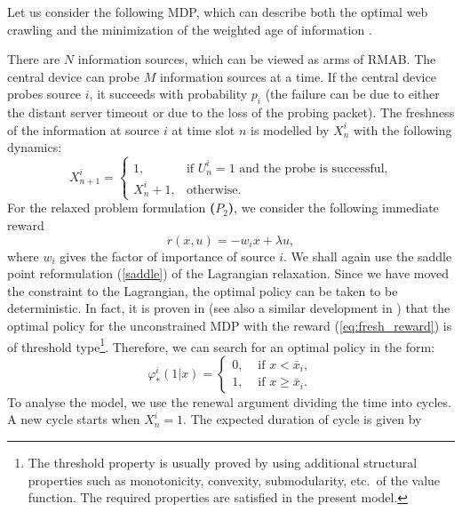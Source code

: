\documentclass[12pt]{article}
\numberwithin{equation}{section}
\newcommand{\1}{\textbf{1}}
\begin{document}
Let us consider the following MDP, which can describe both the optimal 
web crawling \cite{Avrachenkov} and the minimization of the weighted age of information \cite{Hsu,Sombabu}. 

There are $N$ information sources, which can be viewed as arms of RMAB. The central device can 
probe $M$ information sources at a time. If the central device probes source $i$, it succeeds with
probability $p_i$ (the failure can be due to either the distant server timeout or due to the loss of 
the probing packet). The freshness of the information at source $i$ at time slot $n$ is modelled 
by $X^i_n$ with the following dynamics:
\begin{equation}
\label{eq:fresh_dynamics}
X^i_{n+1}=
\left\{\begin{array}{ll}
1, & \mbox{if \ } U^i_n=1 \mbox{ \ and the probe is successful,}\\
X^i_n + 1, &  \mbox{otherwise}.
\end{array}\right.
\end{equation}
For the relaxed problem formulation \textbf{($P_2$)}, we consider the following immediate
reward
\begin{equation}
\label{eq:fresh_reward}
r(x,u) = -w_i x + \lambda u,
\end{equation}
where $w_i$ gives the factor of importance of source $i$.
We shall again use the saddle point reformulation (\ref{saddle}) of the Lagrangian relaxation.
Since we have moved the constraint to the Lagrangian, the optimal policy can be taken to be deterministic. In fact, it is proven in \cite{Hsu} (see also a similar development in \cite{Avrachenkov})
that the optimal policy for the unconstrained MDP with the reward (\ref{eq:fresh_reward})
is of threshold type\footnote{The threshold property is usually proved by using additional structural properties such as monotonicity, convexity, submodularity, etc.\ of the value function. The required properties are satisfied in the present model.}. Therefore, we can search for an optimal policy in the form:
\begin{equation}
\label{thres_policy}
\varphi^i_*(1|x)=
\left\{\begin{array}{ll}
0, & \mbox{ \ if \ } x < \bar{x}_i,\\
1, & \mbox{ \ if \ } x \ge \bar{x}_i.
\end{array}\right.
\end{equation}
To analyse the model, we use the renewal argument dividing the time into cycles.
A new cycle starts when $X^i_n=1$. The expected duration of cycle is given by
\end{document}
